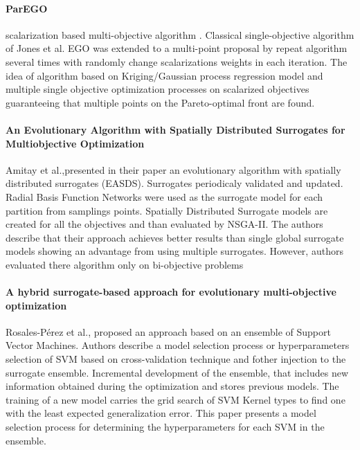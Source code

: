             \paragraph{ParEGO} scalarization based multi-objective algorithm \cite{Knowles06}. Classical single-objective algorithm of Jones et al. EGO was extended to a multi-point proposal by repeat algorithm several times with randomly change scalarizations weights in each iteration. The idea of algorithm based on Kriging/Gaussian process regression model and multiple single objective optimization processes on scalarized objectives guaranteeing that multiple points on the Pareto-optimal front are found.


        \paragraph{An Evolutionary Algorithm with Spatially Distributed Surrogates for Multiobjective Optimization} Amitay et al.,\cite{DistrSurr}presented in their paper an evolutionary algorithm with spatially distributed surrogates (EASDS). Surrogates periodicaly validated and updated. Radial Basis Function Networks were used as the surrogate model for each partition from samplings points. Spatially Distributed Surrogate models are created for all the objectives and than evaluated by NSGA-II. The authors describe that their approach achieves better results than single global surrogate models showing an advantage from using multiple surrogates. However, authors evaluated there algorithm only on bi-objective problems
 
        \paragraph{A hybrid surrogate-based approach for evolutionary multi-objective optimization} Rosales-Pérez et al.,\cite{HybridSurrRCG} proposed an approach based on an ensemble of Support Vector Machines. Authors describe a model selection process or hyperparameters selection of SVM based on cross-validation technique and fother injection to the surrogate ensemble. 
        Incremental development of the ensemble, that includes new information obtained during the optimization and stores previous models. The training of a new model carries the grid search of SVM Kernel types to find one with the least expected generalization error. This paper presents a model selection process for determining the hyperparameters for each SVM in the ensemble.

